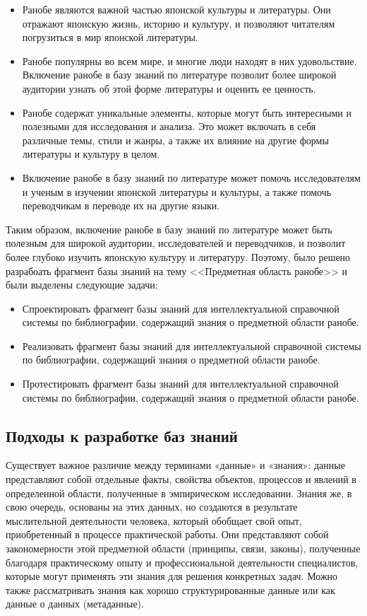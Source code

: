 \begin{itemize}
    \item Ранобе являются важной частью японской культуры и литературы. Они отражают японскую жизнь, историю и культуру, и позволяют читателям погрузиться в мир японской литературы.
    \item Ранобе популярны во всем мире, и многие люди находят в них удовольствие. Включение ранобе в базу знаний по литературе позволит более широкой аудитории узнать об этой форме литературы и оценить ее ценность.
    \item Ранобе содержат уникальные элементы, которые могут быть интересными и полезными для исследования и анализа. Это может включать в себя различные темы, стили и жанры, а также их влияние на другие формы литературы и культуру в целом.
    \item Включение ранобе в базу знаний по литературе может помочь исследователям и ученым в изучении японской литературы и культуры, а также помочь переводчикам в переводе их на другие языки.
\end{itemize}

Таким образом, включение ранобе в базу знаний по литературе может быть полезным для широкой аудитории, исследователей и переводчиков, и позволит более глубоко изучить японскую культуру и литературу. Поэтому, было решено разрабоать фрагмент базы знаний на тему <<Предметная область ранобе>> и были выделены следующие задачи:
\begin{itemize}
    \item Спроектировать фрагмент базы знаний для интеллектуальной справочной системы по библиографии, содержащий знания о предметной области ранобе.
    \item Реализовать фрагмент базы знаний для интеллектуальной справочной системы по библиографии, содержащий знания о предметной области ранобе.
    \item Протестировать фрагмент базы знаний для интеллектуальной справочной системы по библиографии, содержащий знания о предметной области ранобе.
\end{itemize}

\subsection{Подходы к разработке баз знаний}

Существует важное различие между терминами «данные» и «знания»: данные представляют собой отдельные факты, свойства объектов, процессов и явлений в определенной области, полученные в эмпирическом исследовании. Знания же, в свою очередь, основаны на этих данных, но создаются в результате мыслительной деятельности человека, который обобщает свой опыт, приобретенный в процессе практической работы. Они представляют собой закономерности этой предметной области (принципы, связи, законы), полученные благодаря практическому опыту и профессиональной деятельности специалистов, которые могут применять эти знания для решения конкретных задач. Можно также рассматривать знания как хорошо структурированные данные или как данные о данных (метаданные). \cite[с.~19-20]{KBIS_Gavrilova}

